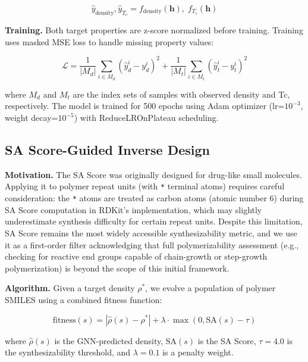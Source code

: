 \documentclass{article}
\begin{document}
\begin{equation}
\hat{y}_{\text{density}}, \hat{y}_{T_c} = f_{\text{density}}(\mathbf{h}),\; f_{T_c}(\mathbf{h})
\end{equation}

\noindent\textbf{Training.}
Both target properties are z-score normalized before training.
Training uses masked MSE loss to handle missing property values:

\begin{equation}
\mathcal{L} = \frac{1}{|M_d|}\sum_{i \in M_d}(\hat{y}^i_d - y^i_d)^2 +
              \frac{1}{|M_t|}\sum_{i \in M_t}(\hat{y}^i_t - y^i_t)^2
\end{equation}

where $M_d$ and $M_t$ are the index sets of samples with observed
density and Tc, respectively.
The model is trained for 500 epochs using Adam optimizer
(lr=$10^{-3}$, weight decay=$10^{-5}$) with ReduceLROnPlateau scheduling.

\subsection{SA Score-Guided Inverse Design}

\noindent\textbf{Motivation.}
The SA Score \citep{ertl_sa_score_2009} was originally designed for
drug-like small molecules. Applying it to polymer repeat units (with \texttt{*}
terminal atoms) requires careful consideration: the \texttt{*} atoms are
treated as carbon atoms (atomic number 6) during SA Score computation in
RDKit's implementation, which may slightly underestimate synthesis difficulty
for certain repeat units. Despite this limitation, SA Score remains the most
widely accessible synthesizability metric, and we use it as a first-order
filter acknowledging that full polymerizability assessment (e.g., checking
for reactive end groups capable of chain-growth or step-growth polymerization)
is beyond the scope of this initial framework.

\noindent\textbf{Algorithm.}
Given a target density $\rho^*$, we evolve a population of polymer SMILES
using a combined fitness function:

\begin{equation}
\text{fitness}(s) = |\hat{\rho}(s) - \rho^*| + \lambda \cdot \max(0, \text{SA}(s) - \tau)
\end{equation}

where $\hat{\rho}(s)$ is the GNN-predicted density, $\text{SA}(s)$ is the SA Score,
$\tau = 4.0$ is the synthesizability threshold, and $\lambda = 0.1$ is a penalty weight.
\end{document}
